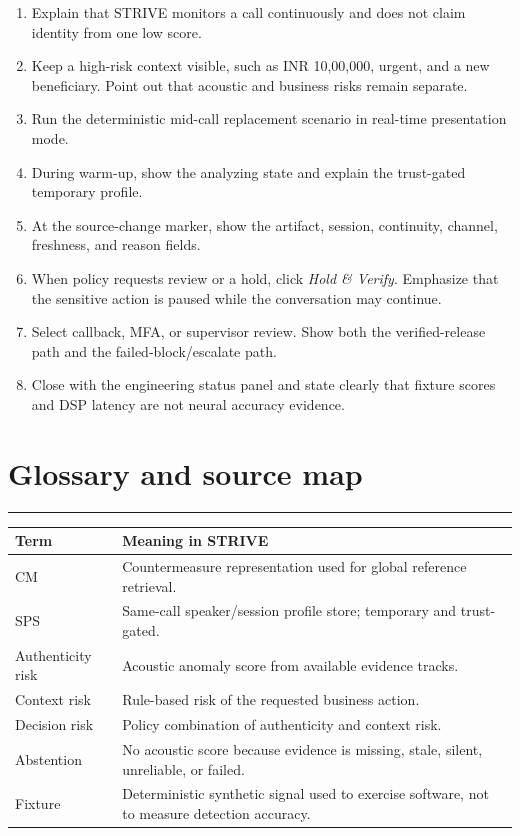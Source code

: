 \documentclass[10pt,a4paper]{article}
\newcommand{\sectionrule}{\vspace{-2mm}\textcolor{blue}{\rule{22mm}{1.2pt}}\vspace{2mm}}
\begin{document}
\begin{enumerate}
\item Explain that STRIVE monitors a call continuously and does not claim identity from one low score.
\item Keep a high-risk context visible, such as INR 10,00,000, urgent, and a new beneficiary. Point out that acoustic and business risks remain separate.
\item Run the deterministic mid-call replacement scenario in real-time presentation mode.
\item During warm-up, show the analyzing state and explain the trust-gated temporary profile.
\item At the source-change marker, show the artifact, session, continuity, channel, freshness, and reason fields.
\item When policy requests review or a hold, click \emph{Hold \& Verify}. Emphasize that the sensitive action is paused while the conversation may continue.
\item Select callback, MFA, or supervisor review. Show both the verified-release path and the failed-block/escalate path.
\item Close with the engineering status panel and state clearly that fixture scores and DSP latency are not neural accuracy evidence.
\end{enumerate}

\section{Glossary and source map}
\sectionrule

\begin{tabularx}{\linewidth}{@{}L{34mm}Y@{}}
\toprule
\textbf{Term} & \textbf{Meaning in STRIVE}\\
\midrule
CM & Countermeasure representation used for global reference retrieval.\\
SPS & Same-call speaker/session profile store; temporary and trust-gated.\\
Authenticity risk & Acoustic anomaly score from available evidence tracks.\\
Context risk & Rule-based risk of the requested business action.\\
Decision risk & Policy combination of authenticity and context risk.\\
Abstention & No acoustic score because evidence is missing, stale, silent, unreliable, or failed.\\
Fixture & Deterministic synthetic signal used to exercise software, not to measure detection accuracy.\\
\bottomrule
\end{tabularx}
\end{document}
